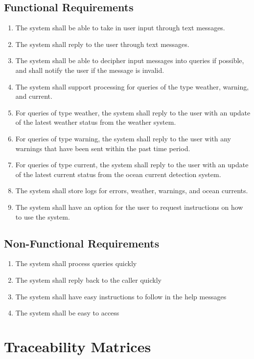 \documentclass{article}
\begin{document}
\subsection{Functional Requirements}
\begin{enumerate}
    \item The system shall be able to take in user input through text messages.
    \item The system shall reply to the user through text messages.
    \item The system shall be able to decipher input messages into queries if possible, and shall notify the user if the message is invalid.
    \item The system shall support processing for queries of the type weather, warning, and current.
    \item For queries of type weather, the system shall reply to the user with an update of the latest weather status from the weather system.
    \item For queries of type warning, the system shall reply to the user with any warnings that have been sent within the past time period.
    \item For queries of type current, the system shall reply to the user with an update of the latest current status from the ocean current detection system.
    \item The system shall store logs for errors, weather, warnings, and ocean currents.
    \item The system shall have an option for the user to request instructions on how to use the system.
\end{enumerate}

\subsection{Non-Functional Requirements} 
\begin{enumerate}
    \item The system shall process queries quickly
    \item The system shall reply back to the caller quickly
    \item The system shall have easy instructions to follow in the help messages
    \item The system shall be easy to access
\end{enumerate}

\section {Traceability Matrices}
\end{document}
